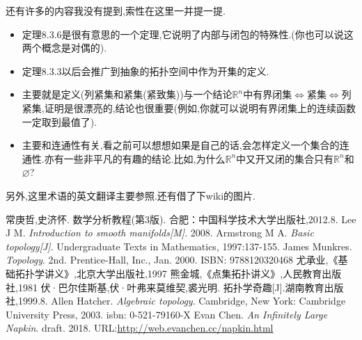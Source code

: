 \documentclass[12pt,A4paper,oneside]{amsart}
\numberwithin{equation}{section}
\theoremstyle{plain}
\theoremstyle{plain}
\theoremstyle{plain}
\numberwithin{equation}{section}
\theoremstyle{remark}
\begin{document}
还有许多的内容我没有提到,索性在这里一并提一提.
\begin{itemize}
	\item 定理8.3.6是很有意思的一个定理,它说明了内部与闭包的特殊性.(你也可以说这两个概念是对偶的).
	\item 定理8.3.3以后会推广到抽象的拓扑空间中作为开集的定义.
	\item \cite[8.4]{CS12}主要就是定义(列紧集和紧集(紧致集))与一个结论$\mathbb{R}^n$中有界闭集$\Leftrightarrow$紧集$\Leftrightarrow$列紧集,证明是很漂亮的,结论也很重要(例如,你就可以说明有界闭集上的连续函数一定取到最值了).
	\item \cite[8.5]{CS12}主要和连通性有关,看之前可以想想如果是自己的话,会怎样定义一个集合的连通性.亦有一些非平凡的有趣的结论.比如,为什么$\mathbb{R}^n$中又开又闭的集合只有$\mathbb{R}^n$和$\varnothing$?
\end{itemize}
另外,这里术语的英文翻译主要参照\cite[Appendix A]{JM08}.还有借了下wiki的图片.















\begin{thebibliography}{99}


%
常庚哲,史济怀. 数学分析教程(第3版). 合肥：中国科学技术大学出版社,2012.8.
%
Lee J M. \emph{Introduction to smooth manifolds[M]}. 2008.
Armstrong M A. \emph{Basic topology[J]}. Undergraduate Texts in Mathematics, 1997:137-155.
James Munkres. \emph{Topology}. 2nd. Prentice-Hall, Inc., Jan. 2000. ISBN: 9788120320468
%
尤承业,《基础拓扑学讲义》,北京大学出版社,1997
%
熊金城,《点集拓扑讲义》,人民教育出版社,1981
%
伏·巴尔佳斯基,伏·叶弗来莫维契,裘光明. 拓扑学奇趣[J].湖南教育出版社,1999.8.
%
Allen Hatcher. \emph{Algebraic topology}. Cambridge, New York: Cambridge University Press, 2003. isbn: 0-521-79160-X
Evan Chen. \emph{An Infinitely Large Napkin}. draft. 2018.
URL:\href{http://web.evanchen.cc/napkin.html}{http://web.evanchen.cc/napkin.html}




\end{thebibliography}
\end{document}
